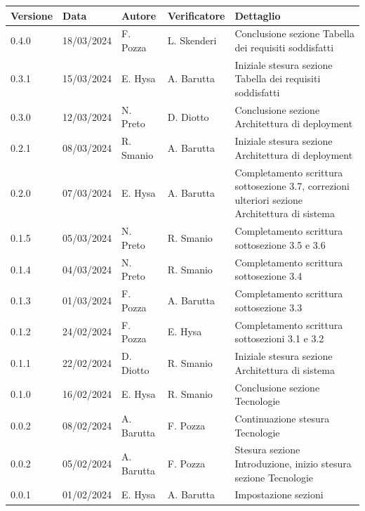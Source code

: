 \documentclass{article}
\begin{document}
\begin{tabular}{|C{1.5cm}|C{2.1cm}|C{2cm}|C{2cm}|C{4.5cm}|}
    \hline 
    \textbf{Versione} & \textbf{Data} & \textbf{Autore} & \textbf{Verificatore} & \textbf{Dettaglio} \\
    \hline
    \label{Git_Action_Version} 0.4.0 & 18/03/2024 & F. Pozza & L. Skenderi & Conclusione sezione Tabella dei requisiti soddisfatti \\ 
    \hline
    \label{Git_Action_Version} 0.3.1 & 15/03/2024 & E. Hysa & A. Barutta & Iniziale stesura sezione Tabella dei requisiti soddisfatti \\ 
    \hline
    \label{Git_Action_Version} 0.3.0 & 12/03/2024 & N. Preto & D. Diotto & Conclusione sezione Architettura di deployment \\ 
    \hline
    \label{Git_Action_Version} 0.2.1 & 08/03/2024 & R. Smanio & A. Barutta & Iniziale stesura sezione Architettura di deployment \\  
    \hline
    \label{Git_Action_Version} 0.2.0 & 07/03/2024 & E. Hysa & A. Barutta & Completamento scrittura sottosezione 3.7, correzioni ulteriori sezione Architettura di sistema \\ 
    \hline
    \label{Git_Action_Version} 0.1.5 & 05/03/2024 & N. Preto & R. Smanio & Completamento scrittura sottosezione 3.5 e 3.6 \\ 
    \hline
    \label{Git_Action_Version} 0.1.4 & 04/03/2024 & N. Preto & R. Smanio & Completamento scrittura sottosezione 3.4 \\ 
    \hline
    \label{Git_Action_Version} 0.1.3 & 01/03/2024 & F. Pozza & A. Barutta & Completamento scrittura sottosezione 3.3  \\ 
    \hline
    \label{Git_Action_Version} 0.1.2 & 24/02/2024 & F. Pozza & E. Hysa & Completamento scrittura sottosezioni 3.1 e 3.2 \\ 
    \hline
    \label{Git_Action_Version} 0.1.1 & 22/02/2024 & D. Diotto & R. Smanio & Iniziale stesura sezione Architettura di sistema \\ 
    \hline
    \label{Git_Action_Version} 0.1.0 & 16/02/2024 & E. Hysa & R. Smanio & Conclusione sezione Tecnologie \\
    \hline
    \label{Git_Action_Version} 0.0.2 & 08/02/2024 & A. Barutta & F. Pozza & Continuazione stesura Tecnologie \\
    \hline
    \label{Git_Action_Version} 0.0.2 & 05/02/2024 & A. Barutta & F. Pozza & Stesura sezione Introduzione, inizio stesura sezione Tecnologie \\ 
    \hline
    \label{Git_Action_Version} 0.0.1 & 01/02/2024 & E. Hysa & A. Barutta & Impostazione sezioni \\ 
    \hline 
\end{tabular}
\end{document}
